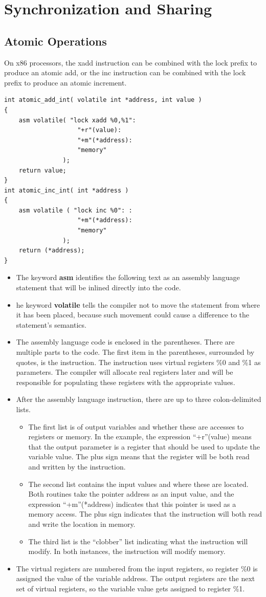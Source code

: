 \documentclass[12pt,a4paper]{report}
\begin{document}
\chapter{Synchronization and Sharing}
\section{Atomic Operations}
On x86 processors, the xadd instruction can be combined with the lock prefix to produce an atomic add, or the inc instruction can be combined with the lock prefix to produce an atomic increment.
\begin{lstlisting}
int atomic_add_int( volatile int *address, int value )
{
	asm volatile( "lock xadd %0,%1":
					"+r"(value):
					"+m"(*address):
					"memory" 
				);
	return value;
}
int atomic_inc_int( int *address )
{
	asm volatile ( "lock inc %0": :
					"+m"(*address):
					"memory" 
				);
	return (*address);
}
\end{lstlisting}
\begin{itemize}
	\item The keyword \textbf{asm} identifies the following text as an assembly language statement that will be inlined directly into the code. 
	\item he keyword \textbf{volatile} tells the compiler not to move the statement from where it has been placed, because such movement could cause a difference to the statement's semantics.
	\item The assembly language code is enclosed in the parentheses. There are multiple parts to the code. The first item in the parentheses, surrounded by quotes, is the instruction. The instruction uses virtual registers \%0 and \%1 as parameters. The compiler will allocate real registers later and will be responsible for populating these registers with the appropriate values.
	\item After the assembly language instruction, there are up to three colon-delimited lists. 
	\begin{itemize}
		\item The first list is of output variables and whether these are accesses to registers or memory. In the example, the expression ``+r''(value) means that the output parameter is a register that should be used to update the variable value. The plus sign means that the register will be both read and written by the instruction.
		\item 	The second list contains the input values and where these are located. Both routines take the pointer address as an input value, and the expression ``+m''(*address) indicates that this pointer is used as a memory access. The plus sign indicates that the instruction will both read and write the location in memory.
		\item The third list is the ``clobber'' list indicating what the instruction will modify. In both instances, the instruction will modify memory.
	\end{itemize}
	\item The virtual registers are numbered from the input registers, so register \%0 is assigned the value of the variable address. The output registers are the next set of virtual registers, so the variable value gets assigned to register \%1.
\end{itemize}
\end{document}

